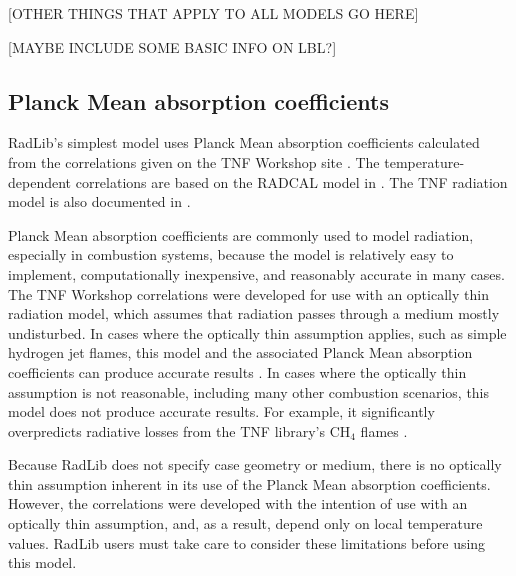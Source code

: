 \documentclass[preprint,12pt, a4paper]{elsarticle}
\begin{document}
[OTHER THINGS THAT APPLY TO ALL MODELS GO HERE]

[MAYBE INCLUDE SOME BASIC INFO ON LBL?]

\subsection{Planck Mean absorption coefficients}
\label{s:planckmean}

RadLib's simplest model uses Planck Mean absorption coefficients calculated from the correlations given on the TNF Workshop site \citep{Smith_2003}. The temperature-dependent correlations are based on the RADCAL model in \citep{Grosshandler_1993}. The TNF radiation model is also documented in \citep{Barlow_2001}.

Planck Mean absorption coefficients are commonly used to model radiation, especially in combustion systems, because the model is relatively easy to implement, computationally inexpensive, and reasonably accurate in many cases. The TNF Workshop correlations were developed for use with an optically thin radiation model, which assumes that radiation passes through a medium mostly undisturbed. In cases where the optically thin assumption applies, such as simple hydrogen jet flames, this model and the associated Planck Mean absorption coefficients can produce accurate results \citep{Barlow_1999}. In cases where the optically thin assumption is not reasonable, including many other combustion scenarios, this model does not produce accurate results. For example, it significantly overpredicts radiative losses from the TNF library's CH$_4$ flames \cite{Frank_2000,Zhu_2002,Coelho_2002}.

Because RadLib does not specify case geometry or medium, there is no optically thin assumption inherent in its use of the Planck Mean absorption coefficients. However, the correlations were developed with the intention of use with an optically thin assumption, and, as a result, depend only on local temperature values. RadLib users must take care to consider these limitations before using this model. 
\end{document}
